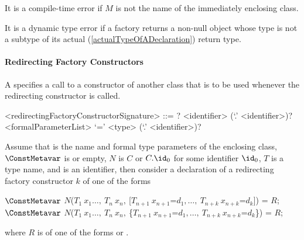 \documentclass[makeidx]{article}
\begin{document}
\LMHash{}%
It is a compile-time error if $M$ is not the name of the immediately enclosing class.

\LMHash{}%
It is a dynamic type error if a factory returns a non-null object
whose type is not a subtype of its actual
(\ref{actualTypeOfADeclaration})
return type.




\paragraph{Redirecting Factory Constructors}

\LMHash{}%
A 
specifies a call to a constructor of another class that is to be used
whenever the redirecting constructor is called.

\begin{grammar}
<redirectingFactoryConstructorSignature> ::= \gnewline{}
  \CONST{}? \FACTORY{} <identifier> (`.' <identifier>)? <formalParameterList> `='
  \gnewline{} <type> (`.' <identifier>)?
\end{grammar}

Assume that
is the name and formal type parameters of the enclosing class,
$\ConstMetavar$ is \CONST{} or empty,
$N$ is $C$ or $C.\id_0$ for some identifier $\id_0$,
$T$ is a type name, and \id{} is an identifier,
then consider a declaration of a redirecting factory constructor $k$ of one of the forms

\begin{normativeDartCode}
$\ConstMetavar$ \FACTORY{}
    $N$($T_1\ x_1 \ldots,\ T_n\ x_n,\ $[$T_{n+1}\ x_{n+1}$=$d_1, \ldots,\ T_{n+k}\ x_{n+k}$=$d_k$]) = $R$;
\\
$\ConstMetavar$ \FACTORY{}
    $N$($T_1\ x_1 \ldots,\ T_n\ x_n,\ $\{$T_{n+1}\ x_{n+1}$=$d_1, \ldots,\ T_{n+k}\ x_{n+k}$=$d_k$\}) = $R$;
\end{normativeDartCode}

\noindent
where $R$ is of one of the forms
 or
.
\end{document}
